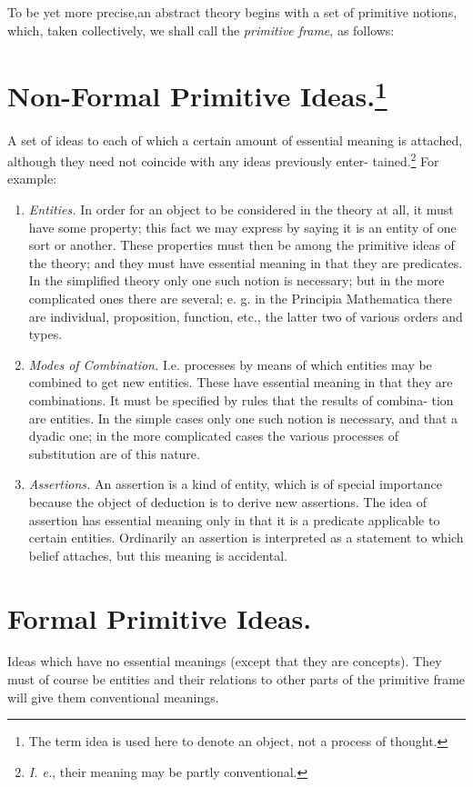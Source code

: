 \documentclass[10pt, twoside]{extarticle}
\newcommand\litem[1]{\item{\textit{#1}}}
\theoremstyle{breaktheorem}
\theoremstyle{mylemma}
\theoremstyle{mydefinition}
\theoremstyle{mycorollary}
\begin{document}
To be yet more precise,an abstract theory begins with a set of primitive
notions, which, taken collectively, we shall call the \textit{primitive frame}, as follows:

\section[Non-Formal Primitive Ideas.]{Non-Formal Primitive Ideas.\footnote{The term idea is used here to denote an object, not a process of thought.}}
\indent A set of ideas to each of which a certain amount of essential meaning is
attached, although they need not coincide with any ideas previously enter-
tained.\footnote{\textit{I. e.}, their meaning may be partly conventional.} For example:

\begin{enumerate}[label=\arabic*.,font=\itshape,wide]
\litem{Entities.} In order for an object to be considered in the theory at
all, it must have some property; this fact we may express by saying it is
an entity of one sort or another. These properties must then be among the
primitive ideas of the theory; and they must have essential meaning in
that they are predicates. In the simplified theory only one such notion is
necessary; but in the more complicated ones there are several; e. g. in the
Principia Mathematica there are individual, proposition, function, etc., the
latter two of various orders and types.

\litem{Modes of Combination.} I.e. processes by means of which entities may
be combined to get new entities. These have essential meaning in that they
are combinations. It must be specified by rules that the results of combina-
tion are entities. In the simple cases only one such notion is necessary, and
that a dyadic one; in the more complicated cases the various processes of
substitution are of this nature.

\litem{Assertions.} An assertion is a kind of entity, which is of special
importance because the object of deduction is to derive new assertions. The
idea of assertion has essential meaning only in that it is a predicate applicable
to certain entities. Ordinarily an assertion is interpreted as a statement to
which belief attaches, but this meaning is accidental.
\end{enumerate}

\section{Formal Primitive Ideas.}
\indent Ideas which have no essential meanings (except that they are concepts).
They must of course be entities and their relations to other parts of the
primitive frame will give them conventional meanings.
\end{document}
